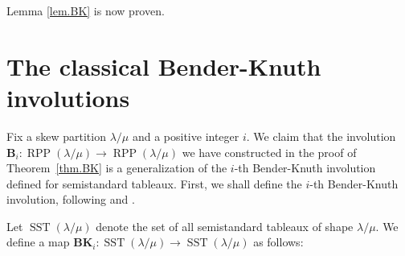 \documentclass[12pt]{article}
\theoremstyle{plain}
\theoremstyle{definition}
\def\lm{{\lambda/\mu}}
\begin{document}
Lemma \ref{lem.BK} is now proven.

\section{\label{sect.BKclassical}The classical Bender-Knuth involutions}

\def\BK{{\mathbf{BK}}}

Fix a skew partition $\lambda/\mu$ and a positive integer $i$.
We claim that the involution $\mathbf{B}_{i}:\operatorname*{RPP}\left(
\lambda/\mu\right)  \rightarrow\operatorname*{RPP}\left(  \lambda/\mu\right)
$ we have constructed in the proof of Theorem~\ref{thm.BK}
is a generalization of the $i$-th Bender-Knuth involution defined for
semistandard tableaux. First, we shall
define the $i$-th Bender-Knuth involution, following \cite[proof of
Proposition 2.11]{GriRei15} and \cite[proof of Theorem 7.10.2]{Stan99}.

Let $\operatorname*{SST}\left(  \lambda/\mu\right)  $ denote the set of all
semistandard tableaux of shape $ \lm$. We define a
map $\BK_{i}:\operatorname*{SST}\left(  \lambda/\mu\right)  \rightarrow
\operatorname*{SST}\left(  \lambda/\mu\right)  $ as follows:
\end{document}
